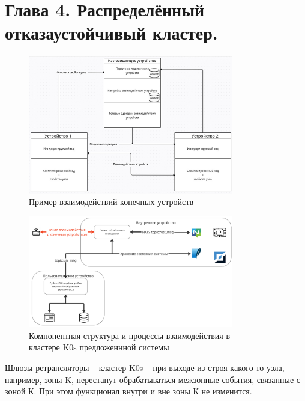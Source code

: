 \documentclass[14pt,a4paper]{extarticle}
\begin{document}
\section{Глава 4. Распределённый отказаустойчивый кластер.}


\begin{figure}[h]
    \centering
    \includegraphics[width=0.8\textwidth]{images/Fig09.png}
    \caption{Пример взаимодействий конечных устройств}
    \label{fig:Connect_end_device_example}
\end{figure}


\begin{figure}[H]
    \centering
    \includegraphics[width=0.8\textwidth]{images/InternalSystemDesign.png}
    \captionsetup{justification=centering}
    \caption{Компонентная структура и процессы взаимодействия в\\кластере K0s предложеннной системы}
    \label{fig:InternalSystemDesign}
\end{figure}


Шлюзы-ретрансляторы -- кластер K0s -- при выходе из строя какого-то узла, например, зоны
K, перестанут обрабатываться межзонные события, связанные с зоной К. При этом функционал внутри и вне зоны
К не изменится.
\end{document}
